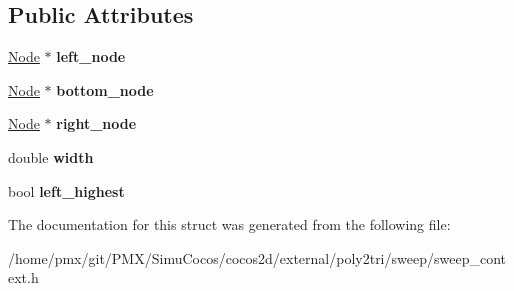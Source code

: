 \subsection*{Public Attributes}
\begin{DoxyCompactItemize}
\item 
\mbox{\label{structp2t_1_1SweepContext_1_1Basin_a536d0a43a2063f3717be62275ba50a81}} 
\hyperlink{structp2t_1_1Node}{Node} $\ast$ {\bfseries left\+\_\+node}
\item 
\mbox{\label{structp2t_1_1SweepContext_1_1Basin_a447ea8134da4edbf68d1702d3517f506}} 
\hyperlink{structp2t_1_1Node}{Node} $\ast$ {\bfseries bottom\+\_\+node}
\item 
\mbox{\label{structp2t_1_1SweepContext_1_1Basin_abe8d5723a7d78adb856fca5439b9cd6e}} 
\hyperlink{structp2t_1_1Node}{Node} $\ast$ {\bfseries right\+\_\+node}
\item 
\mbox{\label{structp2t_1_1SweepContext_1_1Basin_af3a83853a71d90a5ad0e2db66f44911c}} 
double {\bfseries width}
\item 
\mbox{\label{structp2t_1_1SweepContext_1_1Basin_a91a2cdcccb03f88b66ce7e86e3d9820f}} 
bool {\bfseries left\+\_\+highest}
\end{DoxyCompactItemize}


The documentation for this struct was generated from the following file\+:\begin{DoxyCompactItemize}
\item 
/home/pmx/git/\+P\+M\+X/\+Simu\+Cocos/cocos2d/external/poly2tri/sweep/sweep\+\_\+context.\+h\end{DoxyCompactItemize}
